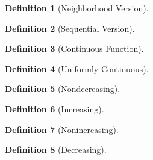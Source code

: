 \documentclass[11pt]{article}
\def \epsilon {\varepsilon}
\theoremstyle{definition}
\newtheorem{definition}{Definition}[section]
\begin{document}
\begin{definition} [Neighborhood Version]
\end{definition}


\begin{definition} [Sequential Version]
\end{definition}


\begin{definition} [Continuous Function]
\end{definition}

\setcounter{definition}{45}
\begin{definition} [Uniformly Continuous]
\end{definition}

\setcounter{definition}{55}
\begin{definition} [Nondecreasing]
\end{definition}


\begin{definition} [Increasing]
\end{definition}


\begin{definition} [Nonincreasing]
\end{definition}


\begin{definition} [Decreasing]
\end{definition}
\end{document}
